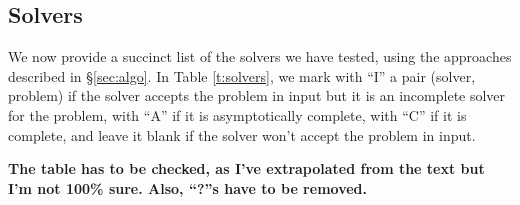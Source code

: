 \subsection{Solvers}\label{subsec:solver}

We now provide a succinct list of the solvers we have tested, using the approaches described in \S \ref{sec:algo}. In Table \ref{t:solvers}, we mark with ``I'' a pair (solver, problem) if the solver accepts the problem in input but it is an incomplete solver for the problem, with ``A'' if it is asymptotically complete, with ``C'' if it is complete, and leave it blank if the solver won't accept the problem in input.

{\bf The table has to be checked, as I've extrapolated from the text but I'm not 100\% sure. Also, ``?''s have to be removed.}



